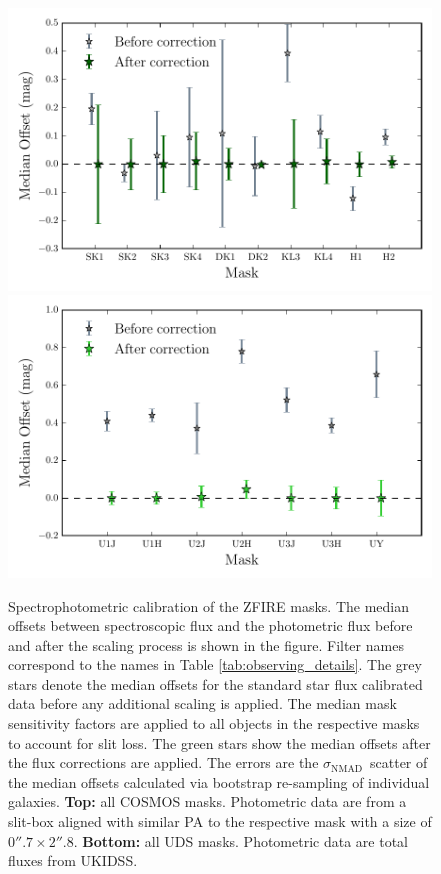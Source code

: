 \documentclass[iop]{emulateapj}
\newcommand{\NMAD}{$\sigma_{\mathrm{NMAD}}$}
\begin{document}
\begin{figure}
\includegraphics[scale=0.57]{figures/scaling_values_cosmos.pdf}
\includegraphics[scale=0.57]{figures/scaling_values_uds.pdf}
\caption{ Spectrophotometric calibration of the ZFIRE masks. The median offsets between spectroscopic flux and the photometric flux before and after the scaling process is shown in the figure. Filter names correspond to the names in Table \ref{tab:observing_details}.
The grey stars denote the median offsets for the standard star flux calibrated data before any additional scaling is applied. 
The median mask sensitivity factors are applied to all objects in the respective masks to account for slit loss. The green stars show the median offsets after the flux corrections are applied. The errors are the \NMAD\ scatter of the median offsets calculated via bootstrap re-sampling of individual galaxies. 
{\bf Top:} all COSMOS masks. Photometric data are from a slit-box aligned with similar PA to the respective mask with a size of $0''.7 \times 2''.8$.
{\bf Bottom:} all UDS masks. Photometric data are total fluxes from UKIDSS.}
\label{fig:scaling_values}
\end{figure}
\end{document}
